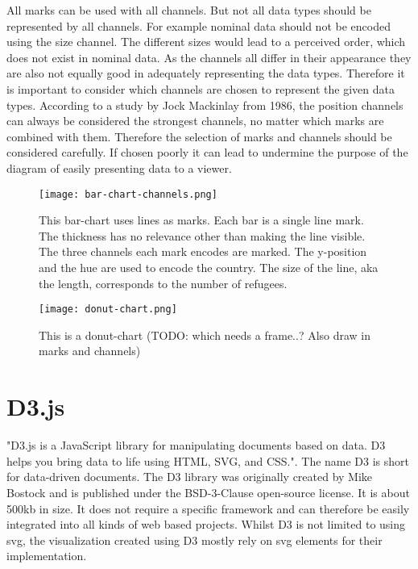 All marks can be used with all channels. But not all data types should be represented by all channels. For example nominal data should not be encoded using the size channel. The different sizes would lead to a perceived order, which does not exist in nominal data. As the channels all differ in their appearance they are also not equally good in adequately representing the data types. Therefore it is important to consider which channels are chosen to represent the given data types.  According to a study by Jock Mackinlay from 1986, the position channels can always be considered the strongest channels, no matter which marks are combined with them\cite{mackinlay1986automating}. Therefore the selection of marks and channels should be considered carefully. If chosen poorly it can lead to undermine the purpose of the diagram of easily presenting data to a viewer.


\begin{figure}
    \texttt{[image: bar-chart-channels.png]}
    \caption[bar-chart]{This bar-chart uses lines as marks. Each bar is a single line mark. The thickness has no relevance other than making the line visible. The three channels each mark encodes are marked. The y-position and the hue are used to encode the country. The size of the line, aka the length, corresponds to the number of refugees.}
    \label{fig:bar-chart}
\end{figure}

\begin{figure}
    \texttt{[image: donut-chart.png]}
    \caption[donut-chart]{This is a donut-chart (TODO: which needs a frame..? Also draw in marks and channels)}
    \label{fig:donut-chart}
\end{figure}

\section{D3.js}

"D3.js is a JavaScript library for manipulating documents based on data. D3 helps you bring data to life using HTML, SVG, and CSS."\cite{d3js}. The name D3 is short for data-driven documents. The D3 library was originally created by Mike Bostock and is published under the BSD-3-Clause open-source license. It is about 500kb in size. It does not require a specific framework and can therefore be easily integrated into all kinds of web based projects. Whilst D3 is not limited to using svg, the visualization created using D3 mostly rely on svg elements for their implementation.

